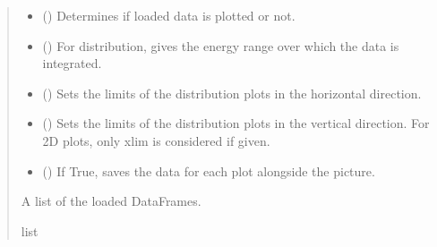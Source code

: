 \documentclass[letterpaper,10pt,english]{sphinxmanual}
\begin{document}
\begin{fulllineitems}
\begin{fulllineitems}
\begin{quote}
\begin{description}
\begin{itemize}
\item {} 
\sphinxAtStartPar
{} () \textendash{} Determines if loaded data is plotted or not.

\item {} 
\sphinxAtStartPar
{} () \textendash{} For distribution, gives the energy range over which the data is integrated.

\item {} 
\sphinxAtStartPar
{} () \textendash{} Sets the limits of the distribution plots in the horizontal direction.

\item {} 
\sphinxAtStartPar
{} () \textendash{} Sets the limits of the distribution plots in the vertical direction. For 2D plots, only xlim is considered if given.

\item {} 
\sphinxAtStartPar
{} () \textendash{} If True, saves the data for each plot alongside the picture.

\end{itemize}

\sphinxAtStartPar
A list of the loaded DataFrames.

\sphinxAtStartPar
list

\end{description}\end{quote}

\end{fulllineitems}



\end{fulllineitems}
\end{document}
